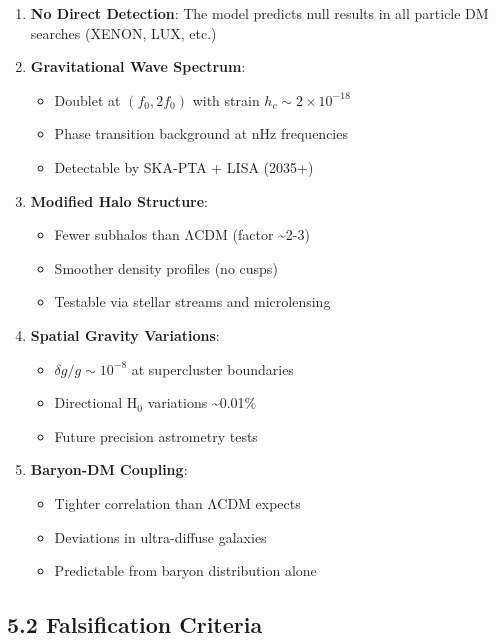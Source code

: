 \documentclass[
  11pt,
]{report}
\providecommand{\tightlist}{%
  \setlength{\itemsep}{0pt}\setlength{\parskip}{0pt}}
\begin{document}
\begin{enumerate}
\def\labelenumi{\arabic{enumi}.}
\item
  \textbf{No Direct Detection}: The model predicts null results in all
  particle DM searches (XENON, LUX, etc.)
\item
  \textbf{Gravitational Wave Spectrum}:

  \begin{itemize}
  \tightlist
  \item
    Doublet at \((f_0, 2f_0)\) with strain
    \(h_c \sim 2 \times 10^{-18}\)
  \item
    Phase transition background at nHz frequencies
  \item
    Detectable by SKA-PTA + LISA (2035+)
  \end{itemize}
\item
  \textbf{Modified Halo Structure}:

  \begin{itemize}
  \tightlist
  \item
    Fewer subhalos than ΛCDM (factor \textasciitilde2-3)
  \item
    Smoother density profiles (no cusps)
  \item
    Testable via stellar streams and microlensing
  \end{itemize}
\item
  \textbf{Spatial Gravity Variations}:

  \begin{itemize}
  \tightlist
  \item
    \(\delta g/g \sim 10^{-8}\) at supercluster boundaries
  \item
    Directional H\(_0\) variations \textasciitilde0.01\%
  \item
    Future precision astrometry tests
  \end{itemize}
\item
  \textbf{Baryon-DM Coupling}:

  \begin{itemize}
  \tightlist
  \item
    Tighter correlation than ΛCDM expects
  \item
    Deviations in ultra-diffuse galaxies
  \item
    Predictable from baryon distribution alone
  \end{itemize}
\end{enumerate}

\subsection{5.2 Falsification Criteria}\label{falsification-criteria}
\end{document}
